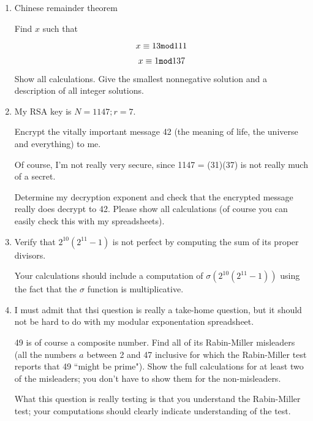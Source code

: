 \documentclass[12pt]{article}
\begin{document}
\begin{enumerate}
\item  Chinese remainder theorem

Find $x$ such that

$$x \equiv 13 {\tt mod}111$$

$$x \equiv 1 {\tt mod} 137$$

Show all calculations.  Give the smallest nonnegative solution and a description of all integer solutions.

\newpage

\item  My RSA key is $N = 1147; r= 7$.

Encrypt the vitally important message 42 (the meaning of life, the universe and everything) to me.

Of course, I'm not really very secure, since 1147 = (31)(37) is not really much of a secret.

Determine my decryption exponent and check that the encrypted message really does decrypt to 42.  Please show all calculations (of course you can easily check this with my spreadsheets).

\newpage

\item  Verify that $2^{10}(2^{11} -1)$ is not perfect by computing the sum of its proper divisors.

Your calculations should include a computation of  $\sigma(2^{10}(2^{11} -1))$ using the fact that the $\sigma$ function is multiplicative.

\newpage

\item  I must admit that thsi question is really a take-home question, but it should not be hard to do with my modular exponentation spreadsheet.  

49 is of course a composite number.  Find all of its Rabin-Miller misleaders (all the numbers $a$ between 2 and 47 inclusive for which the Rabin-Miller test 
reports that 49 ``might be prime").  Show the full calculations for at least two of the misleaders;  you don't have to show them for the non-misleaders.

What this question is really testing is that you understand the Rabin-Miller test;  your computations should clearly indicate understanding of the test.

\newpage


\end{enumerate}
\end{document}
